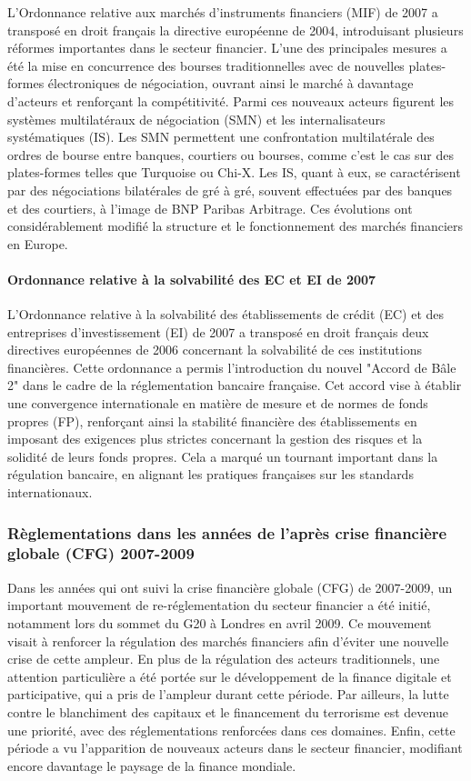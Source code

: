 \documentclass[a4paper, 12pt]{report}
\begin{document}
L'Ordonnance relative aux marchés d’instruments financiers (MIF) de 2007 a transposé en droit français la directive européenne de 2004, introduisant plusieurs réformes importantes dans le secteur financier. L'une des principales mesures a été la mise en concurrence des bourses traditionnelles avec de nouvelles plates-formes électroniques de négociation, ouvrant ainsi le marché à davantage d'acteurs et renforçant la compétitivité. Parmi ces nouveaux acteurs figurent les systèmes multilatéraux de négociation (SMN) et les internalisateurs systématiques (IS). Les SMN permettent une confrontation multilatérale des ordres de bourse entre banques, courtiers ou bourses, comme c'est le cas sur des plates-formes telles que Turquoise ou Chi-X. Les IS, quant à eux, se caractérisent par des négociations bilatérales de gré à gré, souvent effectuées par des banques et des courtiers, à l’image de BNP Paribas Arbitrage. Ces évolutions ont considérablement modifié la structure et le fonctionnement des marchés financiers en Europe.

\paragraph{Ordonnance relative à la solvabilité des EC et EI de 2007}

L'Ordonnance relative à la solvabilité des établissements de crédit (EC) et des entreprises d’investissement (EI) de 2007 a transposé en droit français deux directives européennes de 2006 concernant la solvabilité de ces institutions financières. Cette ordonnance a permis l'introduction du nouvel "Accord de Bâle 2" dans le cadre de la réglementation bancaire française. Cet accord vise à établir une convergence internationale en matière de mesure et de normes de fonds propres (FP), renforçant ainsi la stabilité financière des établissements en imposant des exigences plus strictes concernant la gestion des risques et la solidité de leurs fonds propres. Cela a marqué un tournant important dans la régulation bancaire, en alignant les pratiques françaises sur les standards internationaux.

\subsubsection{Règlementations dans les années de l’après crise financière globale (CFG) 2007-2009}

Dans les années qui ont suivi la crise financière globale (CFG) de 2007-2009, un important mouvement de re-réglementation du secteur financier a été initié, notamment lors du sommet du G20 à Londres en avril 2009. Ce mouvement visait à renforcer la régulation des marchés financiers afin d'éviter une nouvelle crise de cette ampleur. En plus de la régulation des acteurs traditionnels, une attention particulière a été portée sur le développement de la finance digitale et participative, qui a pris de l'ampleur durant cette période. Par ailleurs, la lutte contre le blanchiment des capitaux et le financement du terrorisme est devenue une priorité, avec des réglementations renforcées dans ces domaines. Enfin, cette période a vu l’apparition de nouveaux acteurs dans le secteur financier, modifiant encore davantage le paysage de la finance mondiale.
\end{document}
